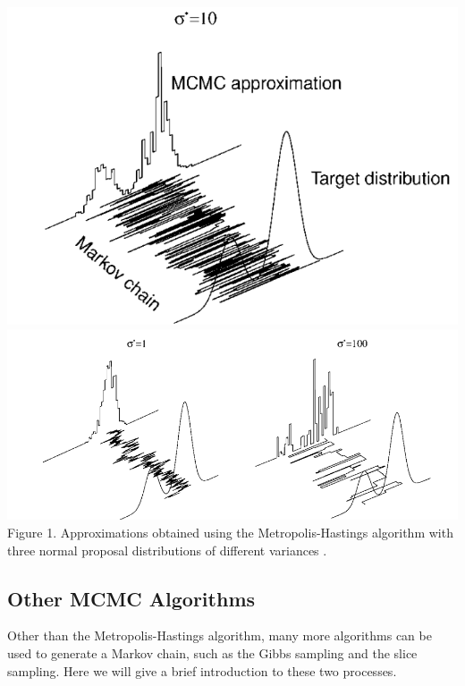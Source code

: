 \documentclass[11pt]{article}
\theoremstyle{break}
\theoremstyle{break}
\begin{document}
\begin{center}
\includegraphics[scale=0.55]{MCMC}\\

\includegraphics[scale=0.68]{MCMC-sample}\\

Figure 1. Approximations obtained using the Metropolis-Hastings algorithm with three normal proposal distributions of different variances \cite{ML}.\\
\end{center}


\subsection{Other MCMC Algorithms}
${}$\qquad Other than the Metropolis-Hastings algorithm, many more algorithms can be used to generate a Markov chain, such as the Gibbs sampling and the slice sampling. Here we will give a brief introduction to these two processes.\\
\end{document}
